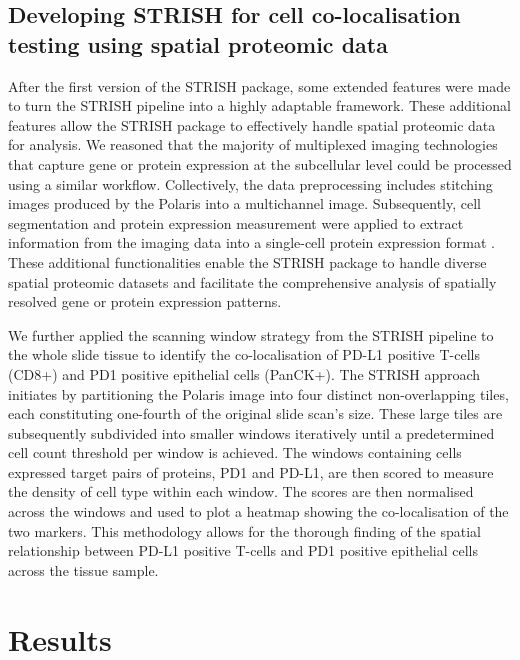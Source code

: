 \subsection{Developing STRISH for cell co-localisation testing using spatial proteomic data}
\label{Sec:3.Cell_colocalisation_PD1_PDL1}	%
After the first version of the STRISH package, some extended features were made to turn the STRISH pipeline into a highly adaptable framework. These additional features allow the STRISH package to effectively handle spatial proteomic data for analysis. We reasoned that the majority of multiplexed imaging technologies that capture gene or protein expression at the subcellular level could be processed using a similar workflow. Collectively, the data preprocessing includes stitching images produced by the Polaris into a multichannel image. Subsequently, cell segmentation and protein expression measurement were applied to extract information from the imaging data into a single-cell protein expression format \cite{shakya2020immune, liu2019comparison, aghaeepour2013critical}. These additional functionalities enable the STRISH package to handle diverse spatial proteomic datasets and facilitate the comprehensive analysis of spatially resolved gene or protein expression patterns.

We further applied the scanning window strategy from the STRISH pipeline to the whole slide tissue to identify the co-localisation of PD-L1 positive T-cells (CD8+) and PD1 positive epithelial cells (PanCK+). The STRISH approach initiates by partitioning the Polaris image into four distinct non-overlapping tiles, each constituting one-fourth of the original slide scan's size. These large tiles are subsequently subdivided into smaller windows iteratively until a predetermined cell count threshold per window is achieved. The windows containing cells expressed target pairs of proteins, PD1 and PD-L1, are then scored to measure the density of cell type within each window. The scores are then normalised across the windows and used to plot a heatmap showing the co-localisation of the two markers. This methodology allows for the thorough finding of the spatial relationship between PD-L1 positive T-cells and PD1 positive epithelial cells across the tissue sample.

\section{Results}

